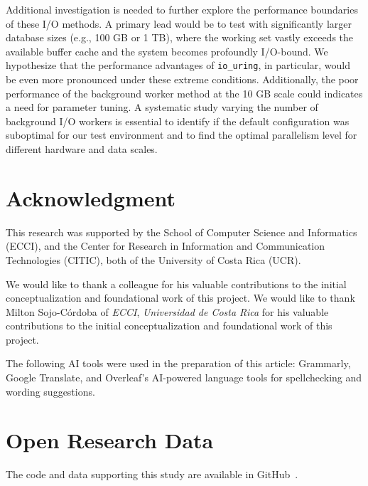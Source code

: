 \documentclass[conference]{IEEEtran}
\begin{document}
Additional investigation is needed to further explore the performance boundaries of these I/O methods. A primary lead would be to test with significantly larger database sizes (e.g., 100 GB or 1 TB), where the working set vastly exceeds the available buffer cache and the system becomes profoundly I/O-bound.
We hypothesize that the performance advantages of \texttt{io\_uring}, in particular, would be even more pronounced under these extreme conditions. Additionally, the poor performance of the background worker method at the 10 GB scale could indicates a need for parameter tuning. A systematic study varying the number of background I/O workers is essential to identify if the default configuration was suboptimal for our test environment and to find the optimal parallelism level for different hardware and data scales.


\section*{Acknowledgment}

This research was supported by \else the School of Computer Science and Informatics (ECCI), and the Center for Research in Information and Communication Technologies (CITIC), both of the University of Costa Rica (UCR)\fi.

\ifanonymous
We would like to thank a colleague for his valuable contributions to the initial conceptualization and foundational work of this project.
\else
We would like to thank Milton Sojo-Córdoba of \textit{ECCI}, \textit{Universidad de Costa Rica} for his valuable contributions to the initial conceptualization and foundational work of this project.
\fi


The following AI tools were used in the preparation of this article: Grammarly, Google Translate, and Overleaf's AI-powered language tools for spellchecking and wording suggestions.

\section*{Open Research Data}
The code and data supporting this study are available in GitHub~\ifanonymous\cite{analysis_async_db_2025_anonymous}\else\cite{analysis_async_db_2025}\fi.


\begin{balance} %
    



\end{balance} %
\end{document}
